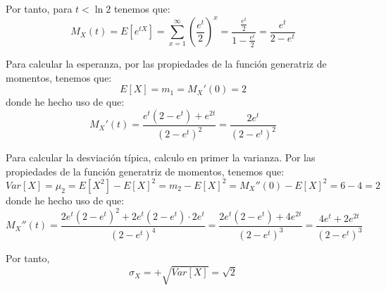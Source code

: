 \begin{ejercicio}
\begin{enumerate}
        Por tanto, para $t<\ln 2$ tenemos que:
        \begin{equation*}
            M_X (t) = E[e^{tX}] = \sum_{x=1}^\infty \left(\frac{e^t}{2}\right)^x
            = \frac{\frac{e^t}{2}}{1-\frac{e^t}{2}}
             = \frac{e^t}{2-e^t}
        \end{equation*}

        Para calcular la esperanza, por las propiedades de la función generatriz de momentos, tenemos que:
        \begin{equation*}
            E[X] = m_1 = M_X'(0) = 2
        \end{equation*}
        donde he hecho uso de que:
        \begin{equation*}
            M_X'(t) = \frac{e^t(2-e^t) +e^{2t}}{(2-e^t)^2}
            = \frac{2e^t}{(2-e^t)^2}
        \end{equation*}

        Para calcular la desviación típica, calculo en primer la varianza. Por las propiedades de la función generatriz de momentos, tenemos que:
        \begin{equation*}
            Var[X] = \mu_2 = E[X^2] - E[X]^2 = m_2 - E[X]^2 = M_X''(0) - E[X]^2 = 6-4 = 2
        \end{equation*}
        donde he hecho uso de que:
        \begin{equation*}
            M_X''(t) = \frac{2e^t(2-e^t)^2 +2e^t(2-e^t)\cdot 2e^t}{(2-e^t)^4}
            = \frac{2e^t(2-e^t) +4e^{2t}}{(2-e^t)^3}
            = \frac{4e^t +2e^{2t}}{(2-e^t)^3}
        \end{equation*}

        Por tanto,
        \begin{equation*}
            \sigma_X = +\sqrt{Var[X]} = \sqrt{2}
        \end{equation*}
    \end{enumerate}
\end{ejercicio}


